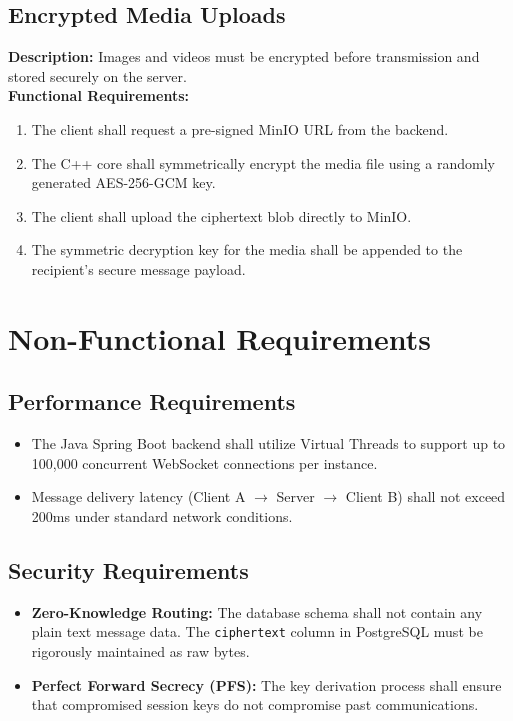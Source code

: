\documentclass[12pt, a4paper]{article}
\begin{document}
\subsection{Encrypted Media Uploads}
\textbf{Description:} Images and videos must be encrypted before transmission and stored securely on the server.\\
\textbf{Functional Requirements:}
\begin{enumerate}
    \item The client shall request a pre-signed MinIO URL from the backend.
    \item The C++ core shall symmetrically encrypt the media file using a randomly generated AES-256-GCM key.
    \item The client shall upload the ciphertext blob directly to MinIO.
    \item The symmetric decryption key for the media shall be appended to the recipient's secure message payload.
\end{enumerate}

\section{Non-Functional Requirements}

\subsection{Performance Requirements}
\begin{itemize}
    \item The Java Spring Boot backend shall utilize Virtual Threads to support up to 100,000 concurrent WebSocket connections per instance.
    \item Message delivery latency (Client A $\rightarrow$ Server $\rightarrow$ Client B) shall not exceed 200ms under standard network conditions.
\end{itemize}

\subsection{Security Requirements}
\begin{itemize}
    \item \textbf{Zero-Knowledge Routing:} The database schema shall not contain any plain text message data. The \texttt{ciphertext} column in PostgreSQL must be rigorously maintained as raw bytes.
    \item \textbf{Perfect Forward Secrecy (PFS):} The key derivation process shall ensure that compromised session keys do not compromise past communications.
\end{itemize}
\end{document}
